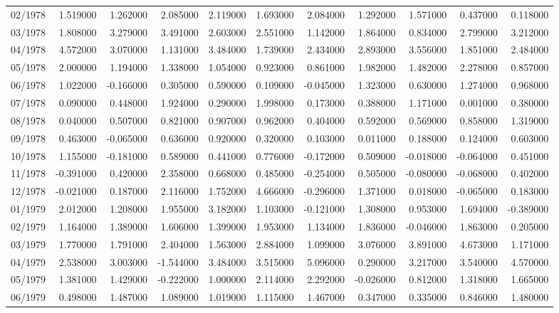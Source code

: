 \begin{tabular}{lrrrrrrrrrr}
02/1978 & 1.519000 & 1.262000 & 2.085000 & 2.119000 & 1.693000 & 2.084000 & 1.292000 & 1.571000 & 0.437000 & 0.118000 \\
03/1978 & 1.808000 & 3.279000 & 3.491000 & 2.603000 & 2.551000 & 1.142000 & 1.864000 & 0.834000 & 2.799000 & 3.212000 \\
04/1978 & 4.572000 & 3.070000 & 1.131000 & 3.484000 & 1.739000 & 2.434000 & 2.893000 & 3.556000 & 1.851000 & 2.484000 \\
05/1978 & 2.000000 & 1.194000 & 1.338000 & 1.054000 & 0.923000 & 0.861000 & 1.982000 & 1.482000 & 2.278000 & 0.857000 \\
06/1978 & 1.022000 & -0.166000 & 0.305000 & 0.590000 & 0.109000 & -0.045000 & 1.323000 & 0.630000 & 1.274000 & 0.968000 \\
07/1978 & 0.090000 & 0.448000 & 1.924000 & 0.290000 & 1.998000 & 0.173000 & 0.388000 & 1.171000 & 0.001000 & 0.380000 \\
08/1978 & 0.040000 & 0.507000 & 0.821000 & 0.907000 & 0.962000 & 0.404000 & 0.592000 & 0.569000 & 0.858000 & 1.319000 \\
09/1978 & 0.463000 & -0.065000 & 0.636000 & 0.920000 & 0.320000 & 0.103000 & 0.011000 & 0.188000 & 0.124000 & 0.603000 \\
10/1978 & 1.155000 & -0.181000 & 0.589000 & 0.441000 & 0.776000 & -0.172000 & 0.509000 & -0.018000 & -0.064000 & 0.451000 \\
11/1978 & -0.391000 & 0.420000 & 2.358000 & 0.668000 & 0.485000 & -0.254000 & 0.505000 & -0.080000 & -0.068000 & 0.402000 \\
12/1978 & -0.021000 & 0.187000 & 2.116000 & 1.752000 & 4.666000 & -0.296000 & 1.371000 & 0.018000 & -0.065000 & 0.183000 \\
01/1979 & 2.012000 & 1.208000 & 1.955000 & 3.182000 & 1.103000 & -0.121000 & 1.308000 & 0.953000 & 1.694000 & -0.389000 \\
02/1979 & 1.164000 & 1.389000 & 1.606000 & 1.399000 & 1.953000 & 1.134000 & 1.836000 & -0.046000 & 1.863000 & 0.205000 \\
03/1979 & 1.770000 & 1.791000 & 2.404000 & 1.563000 & 2.884000 & 1.099000 & 3.076000 & 3.891000 & 4.673000 & 1.171000 \\
04/1979 & 2.538000 & 3.003000 & -1.544000 & 3.484000 & 3.515000 & 5.096000 & 0.290000 & 3.217000 & 3.540000 & 4.570000 \\
05/1979 & 1.381000 & 1.429000 & -0.222000 & 1.000000 & 2.114000 & 2.292000 & -0.026000 & 0.812000 & 1.318000 & 1.665000 \\
06/1979 & 0.498000 & 1.487000 & 1.089000 & 1.019000 & 1.115000 & 1.467000 & 0.347000 & 0.335000 & 0.846000 & 1.480000 \\

\end{tabular}
